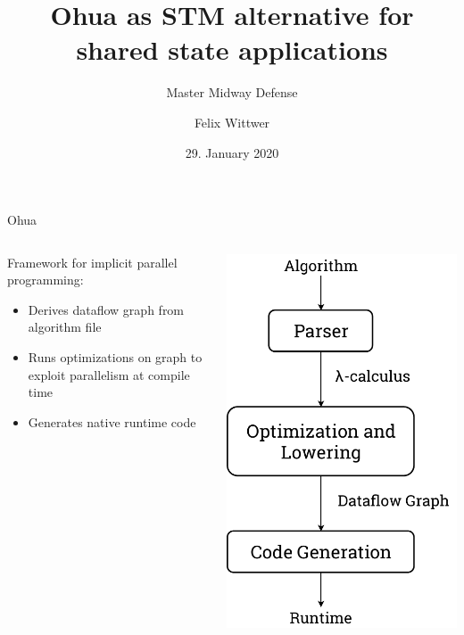 \documentclass[aspectratio=169, usenames, dvipsnames]{beamer}
\title{Ohua as STM alternative for shared state applications}
\subtitle{Master Midway Defense}
\date{29. January 2020}
\author{Felix Wittwer}
\begin{document}
\begin{frame}
\titlepage
\end{frame}

\begin{frame}{Ohua\footnotemark[1]}
  \begin{columns}
    \begin{column}{0.7\textwidth}
      Framework for implicit parallel programming:\\[.55\baselineskip]
      \begin{itemize}
        \item<2-> Derives dataflow graph from algorithm file
        \item<3-> Runs optimizations on graph to exploit parallelism at compile time
        \item<4-> Generates native runtime code
      \end{itemize}
    \end{column}
    \begin{column}{0.25\textwidth}
      \includegraphics[width=\textwidth,height=\textheight,keepaspectratio]{img/ohua}

\end{column}
\end{columns}
\end{frame}
\end{document}
